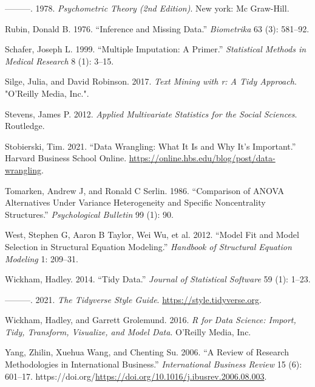 \documentclass[
  letterpaper,
  DIV=11,
  numbers=noendperiod]{scrreprt}
\newlength{\cslhangindent}
\newenvironment{CSLReferences}[2] %
 {\begin{list}{}{%
  \setlength{\itemindent}{0pt}
  \setlength{\leftmargin}{0pt}
  \setlength{\parsep}{0pt}
  \ifodd #1
   \setlength{\leftmargin}{\cslhangindent}
   \setlength{\itemindent}{-1\cslhangindent}
  \fi
  \setlength{\itemsep}{#2\baselineskip}}}
 {\end{list}}
\begin{document}
\begin{CSLReferences}{1}{0}
---------. 1978. \emph{Psychometric Theory (2nd Edition)}. New york: Mc
Graw-Hill.

Rubin, Donald B. 1976. {``Inference and Missing Data.''}
\emph{Biometrika} 63 (3): 581--92.

Schafer, Joseph L. 1999. {``Multiple Imputation: A Primer.''}
\emph{Statistical Methods in Medical Research} 8 (1): 3--15.

Silge, Julia, and David Robinson. 2017. \emph{Text Mining with r: A Tidy
Approach}. "O'Reilly Media, Inc.".

Stevens, James P. 2012. \emph{Applied Multivariate Statistics for the
Social Sciences}. Routledge.

Stobierski, Tim. 2021. {``Data Wrangling: What It Is and Why It's
Important.''} Harvard Business School Online.
\url{https://online.hbs.edu/blog/post/data-wrangling}.

Tomarken, Andrew J, and Ronald C Serlin. 1986. {``Comparison of ANOVA
Alternatives Under Variance Heterogeneity and Specific Noncentrality
Structures.''} \emph{Psychological Bulletin} 99 (1): 90.

West, Stephen G, Aaron B Taylor, Wei Wu, et al. 2012. {``Model Fit and
Model Selection in Structural Equation Modeling.''} \emph{Handbook of
Structural Equation Modeling} 1: 209--31.

Wickham, Hadley. 2014. {``Tidy Data.''} \emph{Journal of Statistical
Software} 59 (1): 1--23.

---------. 2021. \emph{The Tidyverse Style Guide}.
\url{https://style.tidyverse.org}.

Wickham, Hadley, and Garrett Grolemund. 2016. \emph{R for Data Science:
Import, Tidy, Transform, Visualize, and Model Data}. {O'Reilly Media,
Inc.}

Yang, Zhilin, Xuehua Wang, and Chenting Su. 2006. {``A Review of
Research Methodologies in International Business.''} \emph{International
Business Review} 15 (6): 601--17.
https://doi.org/\url{https://doi.org/10.1016/j.ibusrev.2006.08.003}.

\end{CSLReferences}
\end{document}
